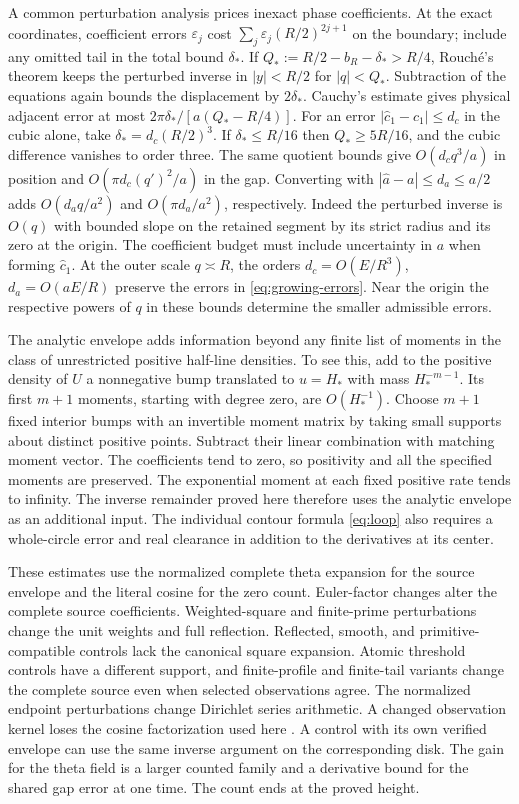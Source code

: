 A common perturbation analysis prices inexact phase coefficients. At
the exact coordinates, coefficient errors \(\varepsilon_j\) cost
\(\sum_j\varepsilon_j(R/2)^{2j+1}\) on the boundary; include any omitted
tail in the total bound \(\delta_*\). If
\(Q_*:=R/2-b_R-\delta_*>R/4\), Rouch\'e's theorem keeps the
perturbed inverse in \(|y|<R/2\) for \(|q|<Q_*\). Subtraction of the
equations again bounds the displacement by \(2\delta_*\).
Cauchy's estimate gives physical adjacent error at most
\(2\pi\delta_*/[a(Q_*-R/4)]\).
For an error \(|\widehat c_1-c_1|\le d_c\) in the cubic alone, take
\(\delta_*=d_c(R/2)^3\). If \(\delta_*\le R/16\) then
\(Q_*\ge5R/16\), and the cubic difference vanishes to order three.
The same quotient bounds give \(O(d_c q^3/a)\) in position and
\(O(\pi d_c(q')^2/a)\) in the gap. Converting with
\(|\widehat a-a|\le d_a\le a/2\) adds
\(O(d_a q/a^2)\) and \(O(\pi d_a/a^2)\), respectively. Indeed the
perturbed inverse is \(O(q)\) with bounded slope on the retained
segment by its strict radius and its zero at the origin. The
coefficient budget must include uncertainty in \(a\) when forming
\(\widehat c_1\). At the outer scale \(q\asymp R\), the orders
\(d_c=O(E/R^3)\), \(d_a=O(aE/R)\) preserve the errors in
\eqref{eq:growing-errors}. Near the origin the respective powers of
\(q\) in these bounds determine the smaller admissible errors.

The analytic envelope adds information beyond any finite list of
moments in the class of unrestricted positive half-line densities.
To see this, add to the positive density of \(U\) a nonnegative
bump translated to \(u=H_*\) with mass \(H_*^{-m-1}\). Its first \(m+1\)
moments, starting with degree zero, are \(O(H_*^{-1})\). Choose \(m+1\)
fixed interior bumps with an invertible moment matrix by taking small
supports about distinct positive points. Subtract their linear
combination with matching moment vector. The coefficients tend to
zero, so positivity and all the specified moments are preserved.
The exponential moment at each fixed positive rate tends to infinity.
The inverse remainder proved here therefore uses the analytic envelope
as an additional input. The individual contour formula \eqref{eq:loop}
also requires a whole-circle error and real clearance in addition to
the derivatives at its center.

These estimates use the normalized complete theta expansion for the
source envelope and the literal cosine for the zero count. Euler-factor
changes alter the complete source coefficients. Weighted-square and
finite-prime perturbations change the unit weights and full
reflection. Reflected, smooth, and primitive-compatible controls lack
the canonical square expansion. Atomic threshold controls have a
different support, and finite-profile and finite-tail variants change
the complete source even when selected observations agree. The
normalized endpoint perturbations change Dirichlet series arithmetic.
A changed observation kernel loses the cosine factorization used here
\cite{EZWindow}. A control with its own verified envelope
can use the same inverse argument on the corresponding disk.
The gain for the theta field is a larger counted family and a
derivative bound for the shared gap error at one time. The count ends
at the proved height.
